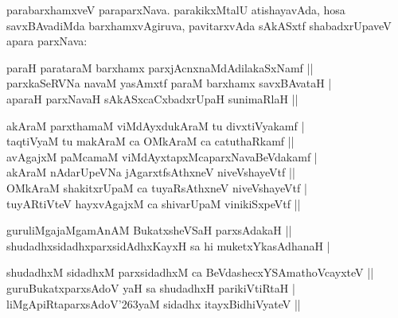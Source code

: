 \begin{entry}
{{parabarxhamxveV paraparxNava. parakikxMtalU atishayavAda, hosa savxBAvadiMda barxhamxvAgiruva,
pavitarxvAda sAkASxtf shabadxrUpaveV apara parxNava:}}
\smallskip
\begin{shl}
paraH parataraM barxhamx parxjAcnxnaMdAdilakaSxNamf ||\\
parxkaSeRVNa navaM yasAmxtf paraM barxhamx savxBAvataH |\\
aparaH parxNavaH sAkASxcaCxbadxrUpaH sunimaRlaH ||
\end{shl}
\medskip
{}
\smallskip
\begin{shl}
akAraM parxthamaM viMdAyxdukAraM tu divxtiVyakamf |\\
taqtiVyaM tu makAraM ca OMkAraM ca catuthaRkamf ||\\
avAgajxM paMcamaM viMdAyxtapxMcaparxNavaBeVdakamf |\\
akAraM nAdarUpeVNa jAgarxtfsAthxneV niveVshayeVtf ||\\
OMkAraM shakitxrUpaM ca tuyaRsAthxneV niveVshayeVtf |\\
tuyARtiVteV hayxvAgajxM ca shivarUpaM vinikiSxpeVtf ||
\end{shl}
\smallskip
{}
\smallskip
\begin{shl}
guruliMgajaMgamAnAM BukatxsheVSaH parxsAdakaH ||\\
shudadhxsidadhxparxsidAdhxKayxH sa hi muketxYkasAdhanaH |
\end{shl}
\medskip
{}
\smallskip
\begin{shl}
shudadhxM sidadhxM parxsidadhxM ca BeVdashecxYSAmathoVcayxteV ||\\
guruBukatxparxsAdoV yaH sa shudadhxH parikiVtiRtaH |\\
liMgApiRtaparxsAdoV{\char'263}yaM sidadhx itayxBidhiVyateV ||\\

\end{shl}
\end{entry}
